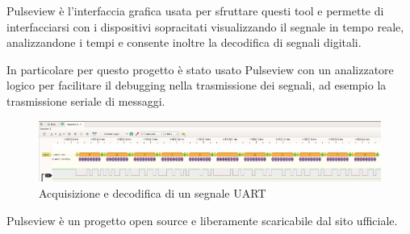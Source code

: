 Pulseview è l'interfaccia grafica usata per sfruttare questi tool e permette di interfacciarsi con i dispositivi sopracitati visualizzando il segnale in tempo reale, analizzandone i tempi e consente inoltre la decodifica di segnali digitali. 

In particolare per questo progetto è stato usato Pulseview con un analizzatore logico per facilitare il debugging nella trasmissione dei segnali, ad esempio la trasmissione seriale di messaggi.

\begin{figure}[H]
\centering
\includegraphics[width=\textwidth]{images/pulseview.png}
\caption{Acquisizione e decodifica di un segnale UART}
\end{figure}

Pulseview è un progetto open source e liberamente scaricabile dal sito ufficiale\cite{Pulseview}.